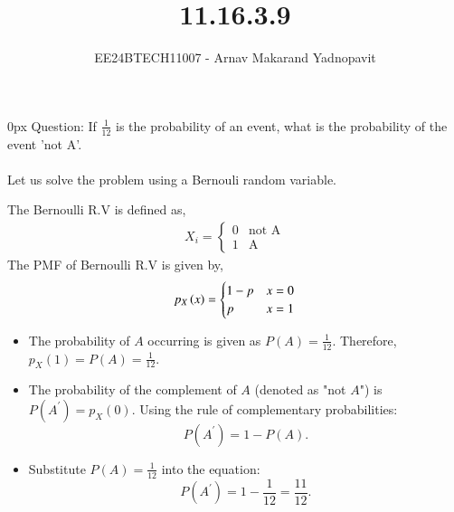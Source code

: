 \documentclass[journal,12pt,onecolumn]{IEEEtran}
\theoremstyle{remark}
\begin{document}
\title{11.16.3.9}
\author{EE24BTECH11007 - Arnav Makarand Yadnopavit}
\maketitle
\renewcommand{\thefigure}{\theenumi}
\renewcommand{\thetable}{\theenumi}
\parindent 0px Question: If $\frac{1}{12}$ is the probability of an event, what is the probability of the event 'not A'.\\
\solution\\
Let us solve the problem using a Bernouli random variable.

    The Bernoulli R.V is defined as,
\begin{align}
	X_i = \begin{cases}
		0 & \text{not A}\\	
		1 & \text{A}	
	\end{cases}
\end{align}
The PMF of Bernoulli R.V is given by,
\begin{align}
  p_X\left(x\right) = \begin{cases}
    1-p & x = 0\\
    p & x = 1
  \end{cases}
\end{align}
\begin{itemize}
    \item The probability of $ A $ occurring is given as $ P(A) = \frac{1}{12} $.  
    Therefore, $ p_X(1) = P(A) = \frac{1}{12} $.

    \item The probability of the complement of $ A $ (denoted as "not $ A $") is $ P(A^\prime) = p_X(0) $. Using the rule of complementary probabilities:
    \[
    P(A^\prime) = 1 - P(A).
    \]

    \item Substitute $ P(A) = \frac{1}{12} $ into the equation:
    \[
    P(A^\prime) = 1 - \frac{1}{12} = \frac{11}{12}.
    \]
\end{itemize}
\end{document}
